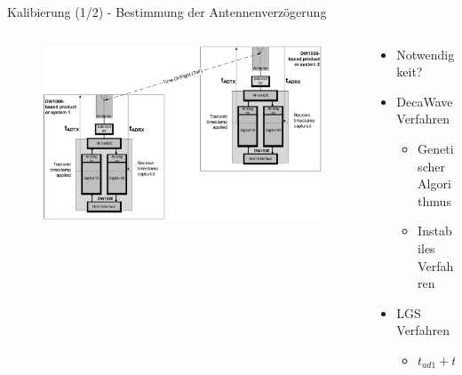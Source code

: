 \documentclass{beamer}
\begin{document}
%
% 
%
\begin{frame}{Kalibierung (1/2) - Bestimmung der Antennenverzögerung}
	\begin{columns}
		\begin{column}{0.5\linewidth}
			\begin{figure}
				\includegraphics[width=\linewidth]{decawave2014calibration_fig1}
				\caption{\cite{decawave2014calibration}}
			\end{figure}
		\end{column}
		\begin{column}{0.5\linewidth}
			\begin{itemize}
				\item Notwendigkeit?
				\item DecaWave Verfahren
					\begin{itemize}
						\item Genetischer Algorithmus
						\item Instabiles Verfahren
					\end{itemize}
				\item LGS Verfahren
					\begin{itemize}
						\item $t_{ad1} + t_{ad2} = tof_{measured} - tof_{actual}$
					\end{itemize}
			\end{itemize}
		\end{column}
	\end{columns}
\end{frame}
\end{document}
